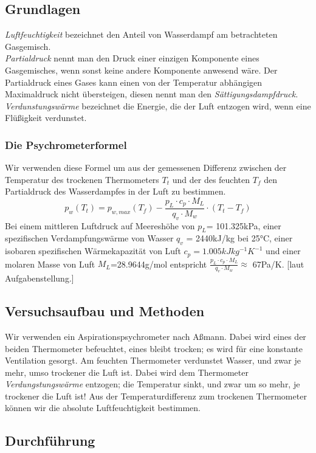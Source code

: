\documentclass{article}
\begin{document}
\subsection{Grundlagen}
\textit{Luftfeuchtigkeit} bezeichnet den Anteil von Wasserdampf am betrachteten Gasgemisch. \\
\textit{Partialdruck} nennt man den Druck einer einzigen Komponente eines Gasgemisches, wenn sonst keine andere Komponente anwesend wäre. Der Partialdruck eines Gases kann einen von der Temperatur abhängigen Maximaldruck nicht übersteigen, diesen nennt man den \textit{Sättigungsdampfdruck.}	\\
\textit{Verdunstungswärme} bezeichnet die Energie, die der Luft entzogen wird, wenn eine Flüßigkeit verdunstet. \\
\subsubsection*{Die Psychrometerformel}
Wir verwenden diese Formel um aus der gemessenen Differenz zwischen der Temperatur des trockenen Thermometers $T_t$ und der des feuchten $T_f$ den Partialdruck des Wasserdampfes in der Luft zu bestimmen.
\begin{equation}
\label{psychrometerformel}
p_w(T_t)=p_{w,max}(T_f)-\frac{p_L\cdot c_p \cdot M_L}{q_v\cdot M_w} \cdot (T_t - T_f)
\end{equation}
Bei einem mittleren Luftdruck auf Meereshöhe von $p_L$= 101.325kPa, einer spezifischen Verdampfungswärme von Wasser $q_v$ = 2440kJ/kg bei 25°C, einer isobaren spezifischen Wärmekapazität von Luft $c_p=1.005kJkg^{-1}K^{-1}$ und einer molaren Masse von Luft $M_L$=28.9644g/mol entspricht $\frac{p_L\cdot c_p \cdot M_L}{q_v\cdot M_w} \approx $ 67Pa/K. [laut Aufgabenstellung.]
\subsection{Versuchsaufbau und Methoden}
Wir verwenden ein Aspirationspsychrometer nach Aßmann. Dabei wird eines der beiden Thermometer befeuchtet, eines bleibt trocken; es wird für eine konstante Ventilation gesorgt. Am feuchten Thermometer verdunstet Wasser, und zwar je mehr, umso trockener die Luft ist. Dabei wird dem Thermometer \textit{Verdungstungswärme} entzogen; die Temperatur sinkt, und zwar um so mehr, je trockener die Luft ist! Aus der Temperaturdifferenz zum trockenen Thermometer können wir die absolute Luftfeuchtigkeit bestimmen. 
\subsection{Durchführung}
\end{document}
